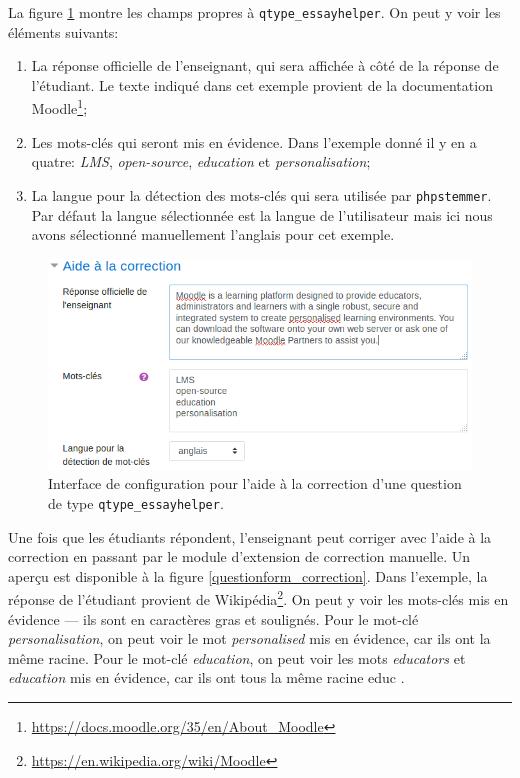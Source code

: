 La figure \ref{questionform_helper} montre les champs propres \`a \texttt{qtype\_essayhelper}.
On peut y voir les \'el\'ements suivants:
\begin{enumerate}
  \item La r\'eponse officielle de l'enseignant, qui sera affich\'ee \`a c\^ot\'e de la r\'eponse de l'\'etudiant. Le texte indiqu\'e dans cet exemple provient de la documentation Moodle\footnote{\url{https://docs.moodle.org/35/en/About_Moodle}};
  \item Les mots-cl\'es qui seront mis en \'evidence. Dans l'exemple donn\'e il y en a quatre: \textit{LMS}, \textit{open-source}, \textit{education} et \textit{personalisation};
  \item La langue pour la d\'etection des mots-cl\'es qui sera utilis\'ee par \texttt{phpstemmer}.
    Par d\'efaut la langue s\'electionn\'ee est la langue de l'utilisateur mais ici nous avons s\'electionn\'e manuellement l'anglais pour cet exemple.
\end{enumerate}
\begin{figure}[htbp]
  \includegraphics[scale=0.85]{images/questionform_helper.png}
  \caption{Interface de configuration pour l'aide \`a la correction d'une question de type \texttt{qtype\_essayhelper}.}
  \label{questionform_helper}
\end{figure}

Une fois que les \'etudiants r\'epondent, l'enseignant peut corriger avec l'aide \`a la correction en passant par le module d'extension de correction manuelle.
Un aperçu est disponible \`a la figure \ref{questionform_correction}.
Dans l'exemple, la r\'eponse de l'\'etudiant provient de Wikip\'edia\footnote{\url{https://en.wikipedia.org/wiki/Moodle}}.
On peut y voir les mots-cl\'es mis en \'evidence --- ils sont en caract\`eres gras et soulign\'es.
Pour le mot-cl\'e \textit{personalisation}, on peut voir le mot \textit{personalised} mis en \'evidence, car ils ont la m\^eme racine.
Pour le mot-cl\'e \textit{education}, on peut voir les mots \textit{educators} et \textit{education} mis en \'evidence, car ils ont tous la m\^eme racine \og educ \fg{} .

